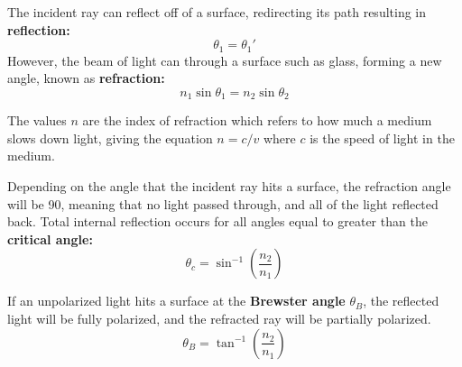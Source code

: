 \documentclass[11pt]{article}
\begin{document}
\begin{minipage}{0.25\textwidth}
\begin{center}

\end{center}

\end{minipage}
\hfill
\begin{minipage}{0.65\textwidth}
  \vspace{0.3cm}
  The incident ray can reflect off of a surface, redirecting its path resulting in \textbf{reflection:}
\begin{equation}
  \theta_1 = \theta_1 ' \tag{reflection}
\end{equation}
However, the beam of light can through a surface such as glass, forming a new angle, known as \textbf{refraction:}
\begin{equation}
  n_1 \sin \theta_1 = n_2 \sin \theta_2 \tag{Snell's Law}
\end{equation}
\end{minipage}
\vspace{1em}

\noindent The values $n$ are the index of refraction which refers to how much a medium slows down light,
giving the equation $n = c /v$ where $c$ is the speed of light in the medium.

\vspace{1em} 
\noindent Depending on the angle that the incident ray hits a surface, the refraction angle will be 90\degree,
meaning that no light passed through, and all of the light reflected back.
Total internal reflection occurs for all angles equal to greater than the \textbf{critical angle:}
\begin{equation}
  \theta_c = \sin^{-1}(\frac{n_2}{n_1}) \tag{critical angle}
\end{equation}

\noindent If an unpolarized light hits a surface at the \textbf{Brewster angle} $\theta_B$,
the reflected light will be fully polarized, and the refracted ray will be partially polarized.
\begin{equation}
\theta_B = \tan^{-1}(\frac{n_2}{n_1}) \tag{Brewster angle}
\end{equation}
\end{document}
